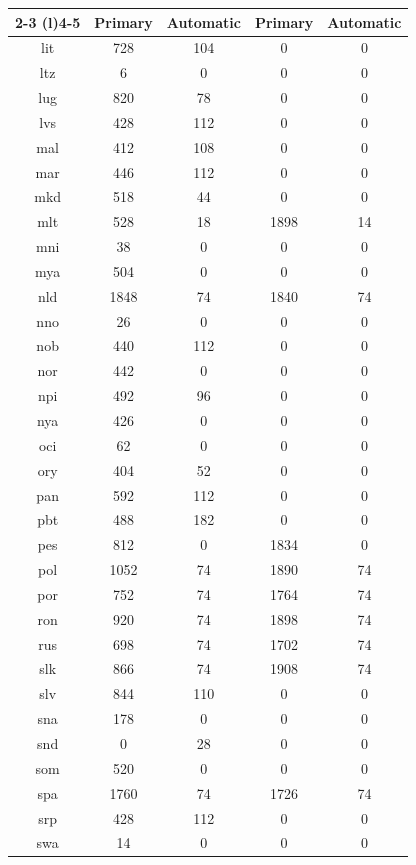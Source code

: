 \begin{table}[!htb]
\begin{minipage}[t]{0.45\textwidth}
\begin{tabular}{@{}ccccc@{}}
        \cmidrule(r){2-3}
        \cmidrule(l){4-5}
        {} & Primary & Automatic & Primary & Automatic \\
        \midrule       
        lit & 728 & 104 & 0 & 0 \\
        ltz & 6 & 0 & 0 & 0 \\
        lug & 820 & 78 & 0 & 0 \\
        lvs & 428 & 112 & 0 & 0 \\
        mal & 412 & 108 & 0 & 0 \\
        mar & 446 & 112 & 0 & 0 \\
        mkd & 518 & 44 & 0 & 0 \\
        mlt & 528 & 18 & 1898 & 14 \\
        mni & 38 & 0 & 0 & 0 \\
        mya & 504 & 0 & 0 & 0 \\
        nld & 1848 & 74 & 1840 & 74 \\
        nno & 26 & 0 & 0 & 0 \\
        nob & 440 & 112 & 0 & 0 \\
        nor & 442 & 0 & 0 & 0 \\
        npi & 492 & 96 & 0 & 0 \\
        nya & 426 & 0 & 0 & 0 \\
        oci & 62 & 0 & 0 & 0 \\
        ory & 404 & 52 & 0 & 0 \\
        pan & 592 & 112 & 0 & 0 \\
        pbt & 488 & 182 & 0 & 0 \\
        pes & 812 & 0 & 1834 & 0 \\
        pol & 1052 & 74 & 1890 & 74 \\
        por & 752 & 74 & 1764 & 74 \\
        ron & 920 & 74 & 1898 & 74 \\
        rus & 698 & 74 & 1702 & 74 \\
        slk & 866 & 74 & 1908 & 74 \\
        slv & 844 & 110 & 0 & 0 \\
        sna & 178 & 0 & 0 & 0 \\
        snd & 0 & 28 & 0 & 0 \\
        som & 520 & 0 & 0 & 0 \\
        spa & 1760 & 74 & 1726 & 74 \\
        srp & 428 & 112 & 0 & 0 \\
        swa & 14 & 0 & 0 & 0 \\

\end{tabular}
\end{minipage}
\end{table}
